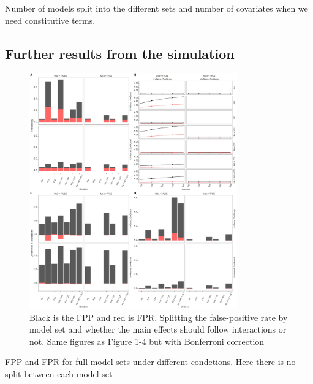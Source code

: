 \noindent Number of models split into the different sets and number of covariates when we need constitutive terms.




\subsection{Further results from the simulation}

\begin{figure}[t]
\includegraphics[width=0.8\textwidth]{R/Analysis/Result/Figures/Figure1BF.jpeg}
\centering
\caption{Black is the FPP and red is FPR.  Splitting the false-positive rate by model set and whether the main effects should follow interactions or not. Same figures as Figure 1-4 but with Bonferroni correction}
\label{fig:mainfigure}
\end{figure}

FPP and FPR for full model sets under different condetions. Here there is no split between each model set


